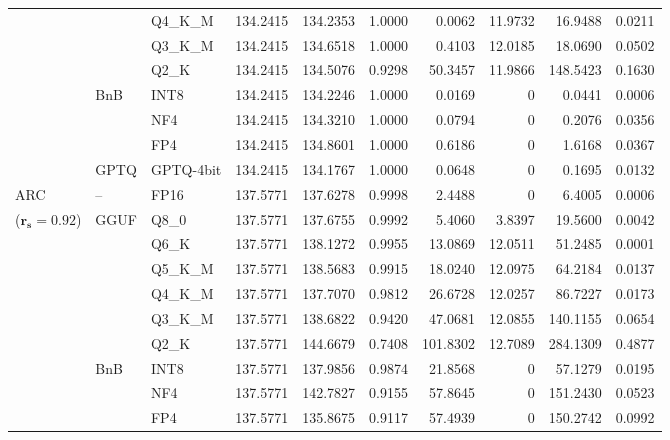 \begin{longtable}{ll l rrrrrrr}
 &  & Q4\_K\_M & 134.2415 & 134.2353 & 1.0000 & 0.0062 & 11.9732 & 16.9488 & 0.0211 \\
 &  & Q3\_K\_M & 134.2415 & 134.6518 & 1.0000 & 0.4103 & 12.0185 & 18.0690 & 0.0502 \\
 &  & Q2\_K & 134.2415 & 134.5076 & \cellcolor{red!18} 0.9298 & \cellcolor{red!18} 50.3457 & 11.9866 & \cellcolor{red!18} 148.5423 & \cellcolor{red!18} 0.1630 \\
 & BnB & INT8 & 134.2415 & 134.2246 & 1.0000 & 0.0169 & \cellcolor{cyan!12} $0$ & 0.0441 & 0.0006 \\
 &  & NF4 & 134.2415 & 134.3210 & 1.0000 & 0.0794 & \cellcolor{cyan!12} $0$ & 0.2076 & 0.0356 \\
 &  & FP4 & 134.2415 & 134.8601 & 1.0000 & 0.6186 & \cellcolor{cyan!12} $0$ & 1.6168 & 0.0367 \\
 & GPTQ & GPTQ-4bit & 134.2415 & 134.1767 & 1.0000 & 0.0648 & \cellcolor{cyan!12} $0$ & 0.1695 & 0.0132 \\
\midrule
ARC & -- & FP16 & 137.5771 & 137.6278 & 0.9998 & 2.4488 & \cellcolor{cyan!12} $0$ & 6.4005 & 0.0006 \\
{\small ($\mathbf{r_s{=}0.92}$)} & GGUF & Q8\_0 & 137.5771 & 137.6755 & 0.9992 & 5.4060 & 3.8397 & 19.5600 & 0.0042 \\
 &  & Q6\_K & 137.5771 & 138.1272 & 0.9955 & 13.0869 & 12.0511 & 51.2485 & 0.0001 \\
 &  & Q5\_K\_M & 137.5771 & 138.5683 & 0.9915 & 18.0240 & 12.0975 & 64.2184 & 0.0137 \\
 &  & Q4\_K\_M & 137.5771 & 137.7070 & 0.9812 & 26.6728 & 12.0257 & 86.7227 & 0.0173 \\
 &  & Q3\_K\_M & 137.5771 & 138.6822 & \cellcolor{red!18} 0.9420 & \cellcolor{red!18} 47.0681 & 12.0855 & \cellcolor{red!18} 140.1155 & \cellcolor{red!18} 0.0654 \\
 &  & Q2\_K & 137.5771 & 144.6679 & \cellcolor{red!35} 0.7408 & \cellcolor{red!35} 101.8302 & 12.7089 & \cellcolor{red!35} 284.1309 & \cellcolor{red!35} 0.4877 \\
 & BnB & INT8 & 137.5771 & 137.9856 & 0.9874 & 21.8568 & \cellcolor{cyan!12} $0$ & 57.1279 & 0.0195 \\
 &  & NF4 & 137.5771 & 142.7827 & \cellcolor{red!18} 0.9155 & \cellcolor{red!18} 57.8645 & \cellcolor{cyan!12} $0$ & \cellcolor{red!18} 151.2430 & \cellcolor{red!18} 0.0523 \\
 &  & FP4 & 137.5771 & 135.8675 & \cellcolor{red!18} 0.9117 & \cellcolor{red!18} 57.4939 & \cellcolor{cyan!12} $0$ & \cellcolor{red!18} 150.2742 & \cellcolor{red!18} 0.0992 \\

\end{longtable}
